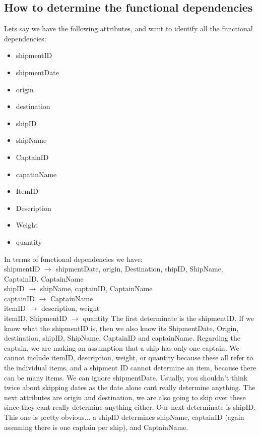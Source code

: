 \documentclass{report}
\begin{document}
\subsection{How to determine the functional dependencies}
Lets say we have the following attributes, and want to identify all the functional dependencies:
\begin{itemize}
    \item shipmentID
    \item shipmentDate
    \item origin
    \item destination
    \item shipID
    \item shipName
    \item CaptainID
    \item capatinName
    \item ItemID
    \item Description
    \item Weight
    \item quantity
\end{itemize}
    In terms of functional dependencies we have: \\
     shipmentID $\rightarrow$ shipmentDate, origin, Destination, shipID, ShipName, CaptainID, CaptainName \\
     shipID $\rightarrow$ shipName, captainID, CaptainName \\
     captainID $\rightarrow$ CaptainName \\
    itemID $\rightarrow$ description, weight \\
    itemID, ShipmentID $\rightarrow$ quantity
   \bigbreak \noindent
The first determinate is the shipmentID. If we know what the shipmentID is, then we also know its ShipmentDate, Origin, destination, shipID, ShipName, CaptainID and captainName. Regarding the captain, we are making an assumption that a ship has only one captain. We cannot include itemID, description, weight, or quantity because these all refer to the individual items, and a shipment ID cannot determine an item, because there can be many items.
\bigbreak \noindent
We can ignore shipmentDate. Usually, you shouldn't think twice about skipping dates as the date alone cant really determine anything. The next attributes are origin and destination, we are also going to skip over these since they cant really determine anything either.
\bigbreak \noindent
Our next determinate is shipID. This one is pretty obvious... a shipID determines shipName, captainID (again assuming there is one captain per ship), and CaptainName.
\end{document}
